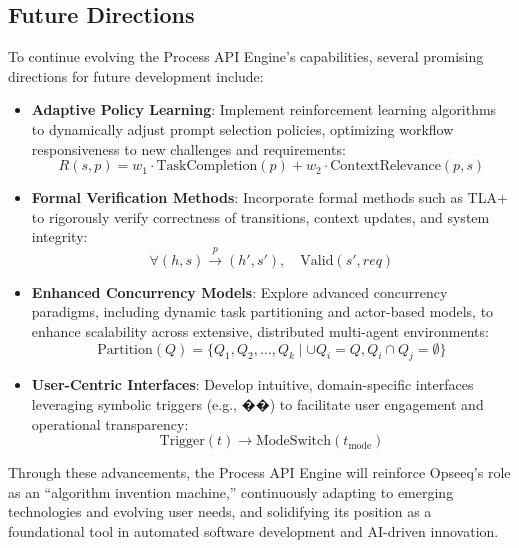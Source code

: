 \documentclass[11pt,a4paper]{article}
\begin{document}
\subsection{Future Directions}
\label{subsec:future_directions}

To continue evolving the Process API Engine's capabilities, several promising directions for future development include:

\begin{itemize}
    \item \textbf{Adaptive Policy Learning}: Implement reinforcement learning algorithms to dynamically adjust prompt selection policies, optimizing workflow responsiveness to new challenges and requirements:
    \[
    R(s,p)=w_1\cdot\text{TaskCompletion}(p)+w_2\cdot\text{ContextRelevance}(p,s)
    \]

    \item \textbf{Formal Verification Methods}: Incorporate formal methods such as TLA+ to rigorously verify correctness of transitions, context updates, and system integrity:
    \[
    \forall(h,s)\xrightarrow{p}(h',s'),\quad\text{Valid}(s',req)
    \]

    \item \textbf{Enhanced Concurrency Models}: Explore advanced concurrency paradigms, including dynamic task partitioning and actor-based models, to enhance scalability across extensive, distributed multi-agent environments:
    \[
    \text{Partition}(Q)=\{Q_1,Q_2,\dots,Q_k\mid\cup Q_i=Q,Q_i\cap Q_j=\emptyset\}
    \]

    \item \textbf{User-Centric Interfaces}: Develop intuitive, domain-specific interfaces leveraging symbolic triggers (e.g., ��) to facilitate user engagement and operational transparency:
    \[
    \text{Trigger}(t)\rightarrow\text{ModeSwitch}(t_{\text{mode}})
    \]
\end{itemize}

Through these advancements, the Process API Engine will reinforce Opseeq’s role as an ``algorithm invention machine,'' continuously adapting to emerging technologies and evolving user needs, and solidifying its position as a foundational tool in automated software development and AI-driven innovation.

\end{document}
